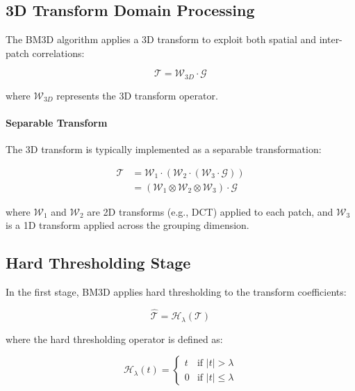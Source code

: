 \documentclass[12pt]{article}
\begin{document}
\subsection{3D Transform Domain Processing}
\label{subsec:3d_transform}

The BM3D algorithm applies a 3D transform to exploit both spatial and inter-patch correlations:

\begin{equation}
    \label{eq:3d_transform}
    \mathcal{T} = \mathcal{W}_{3D} \cdot \mathcal{G}
\end{equation}

where $\mathcal{W}_{3D}$ represents the 3D transform operator.

\paragraph{Separable Transform}
The 3D transform is typically implemented as a separable transformation:

\begin{align}
    \mathcal{T} & = \mathcal{W}_1 \cdot (\mathcal{W}_2 \cdot (\mathcal{W}_3 \cdot \mathcal{G}))   \\
                & = (\mathcal{W}_1 \otimes \mathcal{W}_2 \otimes \mathcal{W}_3) \cdot \mathcal{G}
\end{align}

where $\mathcal{W}_1$ and $\mathcal{W}_2$ are 2D transforms (e.g., DCT) applied to each patch, and $\mathcal{W}_3$ is a 1D transform applied across the grouping dimension.

\subsection{Hard Thresholding Stage}
\label{subsec:hard_thresholding}

In the first stage, BM3D applies hard thresholding to the transform coefficients:

\begin{equation}
    \label{eq:hard_threshold}
    \hat{\mathcal{T}} = \mathcal{H}_{\lambda}(\mathcal{T})
\end{equation}

where the hard thresholding operator is defined as:

\begin{equation}
    \mathcal{H}_{\lambda}(t) = \begin{cases}
        t & \text{if } |t| > \lambda    \\
        0 & \text{if } |t| \leq \lambda
    \end{cases}
\end{equation}
\end{document}
